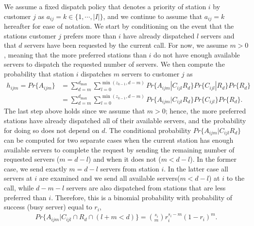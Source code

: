 \documentclass[11pt]{article}\topmargin 0mm
\begin{document}

We assume a fixed dispatch policy that denotes a priority of station $i$ by customer $j$ as $a_{ij}=k \in \{1,\cdots,|I|\}$, and we continue to assume that $a_{ij}=k$ hereafter for ease of notation. We start by conditioning on the event that the stations
customer $j$ prefers more than $i$ have already dispatched $l$
servers and that $d$ servers have been requested by the current
call. For now, we assume $m>0$, meaning that the more preferred
stations than $i$ do not have enough available servers to
dispatch the requested number of servers. We then
compute the probability that station $i$ dispatches $m$ servers
to customer $j$ as
\begin{equation}
\label{eq:hijm1}
\begin{split}
h_{ijm} = Pr\{A_{ijm}\} & = \sum_{d=m}^{d_{\max}} \sum_{l=0}^{\min(z_{k-1},d-m)} Pr\{A_{ijm}|C_{ijl}R_d\}Pr\{C_{ijl}|R_d\} Pr\{R_d\} \\
                        & = \sum_{d=m}^{d_{\max}} \sum_{l=0}^{\min(z_{k-1},d-m)} Pr\{A_{ijm}|C_{ijl}R_d\}Pr\{C_{ijl}\} Pr\{R_d\}.
\end{split}
\end{equation}
The last step above holds since we assume that $m>0$; hence,
the more preferred stations have already dispatched all of
their available servers, and the probability for doing so does
not depend on $d$. The conditional probability
$Pr\{A_{ijm}|C_{ijl}R_d\}$ can be computed for two separate
cases when the current station has enough available servers to complete
the request by sending the remaining number of requested
servers ($m=d-l$) and when it does not ($m<d-l$).  In the former case, we send exactly $m=d-l$ servers from
station $i$. In the latter case all servers at $i$ are
examined and we send all available servers($m<d-l$) at $i$ to
the call, while $d-m-l$ servers are also dispatched from stations that are less preferred than $i$. Therefore, this is a binomial probability with
probability of success (busy server) equal to $r_i$,
\begin{equation}
\label{eq:P(Aijm|Cijl&l+m<d)}
\begin{split}
Pr\{A_{ijm}|C_{ijl} \cap R_d \cap (l+m<d) \} = {s_i \choose m} r_i^{s_i-m}(1-r_i)^m.
\end{split}
\end{equation}
\end{document}
